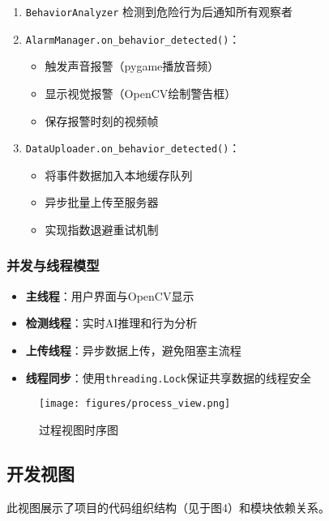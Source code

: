 \documentclass[a4paper,12pt]{article}
\begin{document}
\begin{itemize}
\begin{enumerate}
      \item \texttt{BehaviorAnalyzer} 检测到危险行为后通知所有观察者
      \item \texttt{AlarmManager.on\_behavior\_detected()}：
        \begin{itemize}
          \item 触发声音报警（pygame播放音频）
          \item 显示视觉报警（OpenCV绘制警告框）
          \item 保存报警时刻的视频帧
        \end{itemize}
      \item \texttt{DataUploader.on\_behavior\_detected()}：
        \begin{itemize}
          \item 将事件数据加入本地缓存队列
          \item 异步批量上传至服务器
          \item 实现指数退避重试机制
        \end{itemize}
    \end{enumerate}
\end{itemize}

\subsubsection{并发与线程模型}
\begin{itemize}
  \item \textbf{主线程}：用户界面与OpenCV显示
  \item \textbf{检测线程}：实时AI推理和行为分析
  \item \textbf{上传线程}：异步数据上传，避免阻塞主流程
  \item \textbf{线程同步}：使用\texttt{threading.Lock}保证共享数据的线程安全
\end{itemize}

\begin{figure}[h]
  \centering
  \texttt{[image: figures/process\_view.png]}
  \caption{过程视图时序图}
  \label{fig:process_view}
\end{figure}

\subsection{开发视图}
此视图展示了项目的代码组织结构（见于图4）和模块依赖关系。
\end{document}
